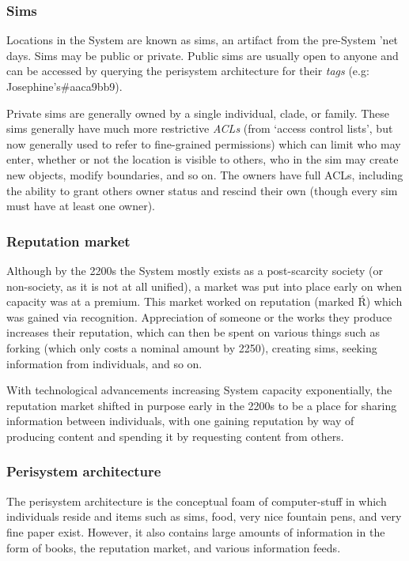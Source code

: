 \subsubsection{Sims}

Locations in the System are known as sims, an artifact from the pre-System 'net days. Sims may be public or private. Public sims are usually open to anyone and can be accessed by querying the perisystem architecture for their \emph{tags} (e.g: Josephine's\#aaca9bb9).

Private sims are generally owned by a single individual, clade, or family. These sims generally have much more restrictive \emph{ACLs} (from `access control lists', but now generally used to refer to fine-grained permissions) which can limit who may enter, whether or not the location is visible to others, who in the sim may create new objects, modify boundaries, and so on. The owners have full ACLs, including the ability to grant others owner status and rescind their own (though every sim must have at least one owner).

\subsubsection{Reputation market}

Although by the 2200s the System mostly exists as a post-scarcity society (or non-society, as it is not at all unified), a market was put into place early on when capacity was at a premium. This market worked on reputation (marked Ŕ) which was gained via recognition. Appreciation of someone or the works they produce increases their reputation, which can then be spent on various things such as forking (which only costs a nominal amount by 2250), creating sims, seeking information from individuals, and so on.

With technological advancements increasing System capacity exponentially, the reputation market shifted in purpose early in the 2200s to be a place for sharing information between individuals, with one gaining reputation by way of producing content and spending it by requesting content from others.

\subsubsection{Perisystem architecture}

The perisystem architecture is the conceptual foam of computer-stuff in which individuals reside and items such as sims, food, very nice fountain pens, and very fine paper exist. However, it also contains large amounts of information in the form of books, the reputation market, and various information feeds.

